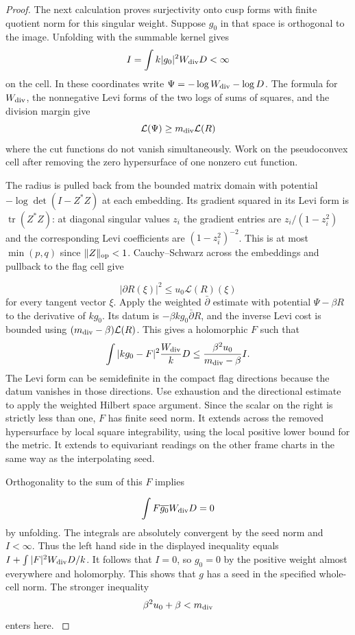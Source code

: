 \begin{proof}
The next calculation proves surjectivity onto cusp
forms with finite quotient norm for this singular
weight. Suppose \(g_0\) in that space is orthogonal
to the image. Unfolding with the summable kernel gives
\[
          I=\int k|g_0|^2 W_{\rm div}D<\infty
\]
on the cell. In these coordinates write
\(\Psi=-\log W_{\rm div}-\log D\). The formula for
\(W_{\rm div}\), the nonnegative Levi forms of the
two logs of sums of squares, and the division
margin give 
\[
  \mathcal L(\Psi)\ge m_{\rm div}\mathcal L(R)
\]
where the cut functions do not vanish simultaneously.
Work on the pseudoconvex cell after removing the
zero hypersurface of one nonzero cut function.

The radius is pulled back from the bounded matrix
domain with potential \(-\log\det(I-Z^*Z)\) at each
embedding. Its gradient squared in its Levi form is
\(\operatorname{tr}(Z^*Z)\): at diagonal singular
values \(z_i\) the gradient entries are
\(z_i/(1-z_i^2)\) and the corresponding Levi
coefficients are \((1-z_i^2)^{-2}\).
This is at most \(\min(p,q)\) since \(\|Z\|_{\rm op}<1\).
Cauchy--Schwarz across the embeddings and pullback
to the flag cell give

\[
  |\partial R(\xi)|^2\le u_0\mathcal L(R)(\xi)
\]
for every tangent vector \(\xi\).
Apply the weighted \(\bar\partial\) estimate with
potential \(\Psi-\beta R\) to the derivative of
\(kg_0\). Its datum is \(-\beta k g_0\bar\partial R\),
and the inverse Levi cost is bounded using
\((m_{\rm div}-\beta)\mathcal L(R)\).
This gives a holomorphic \(F\) such that
\[
 \int |kg_0-F|^2\frac{W_{\rm div}}{k}D
       \le \frac{\beta^2u_0}{m_{\rm div}-\beta}I .
\]
The Levi form can be semidefinite in the compact flag
directions because the datum vanishes in those directions.
Use exhaustion and the directional estimate to apply the
weighted Hilbert space argument. Since the scalar on the
right is strictly less than one, \(F\) has finite seed
norm. It extends across the removed hypersurface by local
square integrability, using the local positive lower
bound for the metric. It extends to equivariant readings
on the other frame charts in the same way as the
interpolating seed.

Orthogonality to the sum of this \(F\) implies

\[
  \int F\overline{g_0}W_{\rm div}D=0
\]
 by unfolding.
The integrals are absolutely convergent by the seed norm
and \(I<\infty\). Thus the left hand side in the displayed
inequality equals \(I+\int |F|^2 W_{\rm div}D/k\).
It follows that \(I=0\), so \(g_0=0\) by the positive
weight almost everywhere and holomorphy. This shows that
\(g\) has a seed in the specified whole-cell norm.
The stronger inequality 
\[
  \beta^2u_0+\beta<m_{\rm div}
\]
enters here.
\cite{hormander-slice}\label{cor:slice-short-division-1}


\end{proof}
